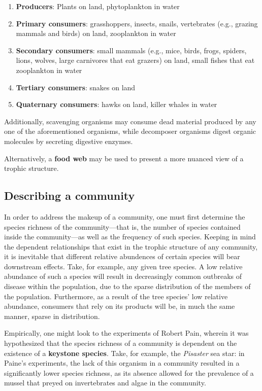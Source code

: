 \documentclass{article}
\begin{document}
\begin{enumerate}
	\item \textbf{Producers}: Plants on land, phytoplankton in water
	\item \textbf{Primary consumers}: grasshoppers, insects, snails,
	vertebrates (e.g., grazing mammals and birds) on land, zooplankton in water
	\item \textbf{Secondary consumers}: small mammals (e.g., mice, birds, frogs,
	spiders, lions, wolves, large carnivores that eat grazers) on land, small
	fishes that eat zooplankton in water
	\item \textbf{Tertiary consumers}: snakes on land
	\item \textbf{Quaternary consumers}: hawks on land, killer whales in water
\end{enumerate}

Additionally, scavenging organisms may consume dead material produced by any one
of the aforementioned organisms, while decomposer organisms digest organic
molecules by secreting digestive enzymes.

Alternatively, a \textbf{food web} may be used to present a more nuanced view of
a trophic structure.

\subsection{Describing a community}

In order to address the makeup of a community, one must first determine
the species richness of the community---that is, the number of species
contained inside the community---as well as the frequency of such species.
Keeping in mind the dependent relationships that exist in the trophic structure
of any community, it is inevitable that different relative abundences of certain
species will bear downstream effects. Take, for example, any given tree species.
A low relative abundance of such a species will result in decreasingly common
outbreaks of disease within the population, due to the sparse distribution of
the members of the population. Furthermore, as a result of the tree species' low
relative abundance, consumers that rely on its products will be, in much the same
manner, sparse in distribution.

Empirically, one might look to the experiments of Robert Pain, wherein it was
hypothesized that the species richness of a community is dependent on the
existence of a \textbf{keystone species}. Take, for example, the \emph{Pisaster}
sea star: in Paine's experiments, the lack of this organism in a community
resulted in a significantly lower species richness, as its absence allowed for
the prevalence of a mussel that preyed on invertebrates and algae in the community.
\end{document}
